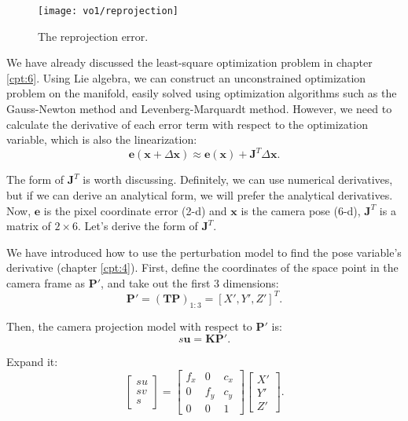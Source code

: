 \begin{figure}[!htp]
	\centering
	\texttt{[image: vo1/reprojection]}
	\caption{The reprojection error.}
	\label{fig:reprojection}
\end{figure}

We have already discussed the least-square optimization problem in chapter \ref{cpt:6}. Using Lie algebra, we can construct an unconstrained optimization problem on the manifold, easily solved using optimization algorithms such as the Gauss-Newton method and Levenberg-Marquardt method. However, we need to calculate the derivative of each error term with respect to the optimization variable, which is also the linearization:
\begin{equation}
\mathbf{e}( \mathbf{x} + \Delta \mathbf{x} ) \approx \mathbf{e}(\mathbf{x}) + \mathbf{J} ^T\Delta \mathbf{x}.
\end{equation}

The form of $\mathbf{J}^T$ is worth discussing. Definitely, we can use numerical derivatives, but if we can derive an analytical form, we will prefer the analytical derivatives. Now, $\mathbf{e}$ is the pixel coordinate error (2-d) and $\mathbf{x}$ is the camera pose (6-d), $\mathbf{J}^T$ is a matrix of $2 \times 6$. Let's derive the form of $\mathbf{J}^T$.

We have introduced how to use the perturbation model to find the pose variable's derivative (chapter \ref{cpt:4}). First, define the coordinates of the space point in the camera frame as $\mathbf{P}'$, and take out the first 3 dimensions:
\begin{equation}
\mathbf{P}' = \left( \mathbf{T}{\mathbf{P}} \right)_{1:3}= [X', Y', Z']^T.
\end{equation}

Then, the camera projection model with respect to $\mathbf{P}'$ is:
\begin{equation}
s {\mathbf{u}} = \mathbf{K} \mathbf{P}'.
\end{equation}

Expand it:
\begin{equation}
\left[ \begin{array}{l}
su\\
sv\\
s
\end{array} \right] = \left[ {\begin{array}{*{20}{c}}
	{{f_x}}&0&{{c_x}}\\
	0&{{f_y}}&{{c_y}}\\
	0&0&1
	\end{array}} \right]\left[ \begin{array}{l}
X'\\
Y'\\
Z'
\end{array} \right].
\end{equation}

